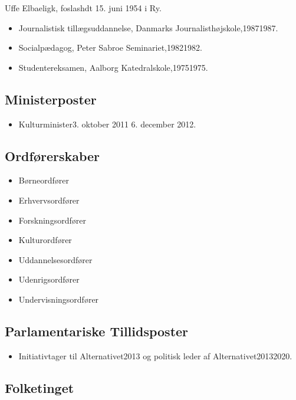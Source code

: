 \documentclass[11pt, a4paper]{awesome-cv}
\begin{document}
\makecvheader[R]
\makelettertitle
\begin{cvletter}
Uffe Elbaeligk, foslashdt 15. juni 1954 i Ry.

\begin{itemize}
\item Journalistisk tillægsuddannelse, Danmarks Journalisthøjskole,19871987.
\item Socialpædagog, Peter Sabroe Seminariet,19821982.
\item Studentereksamen, Aalborg Katedralskole,19751975.
\end{itemize}
\subsection*{Ministerposter}
\begin{itemize}
\item Kulturminister3. oktober 2011  6. december 2012.
\end{itemize}
\subsection*{Ordførerskaber}
\begin{itemize}
\item Børneordfører
\item Erhvervsordfører
\item Forskningsordfører
\item Kulturordfører
\item Uddannelsesordfører
\item Udenrigsordfører
\item Undervisningsordfører
\end{itemize}
\subsection*{Parlamentariske Tillidsposter}
\begin{itemize}
\item Initiativtager til Alternativet2013 og politisk leder af Alternativet20132020.
\end{itemize}
\subsection*{Folketinget}

\end{cvletter}
\end{document}
